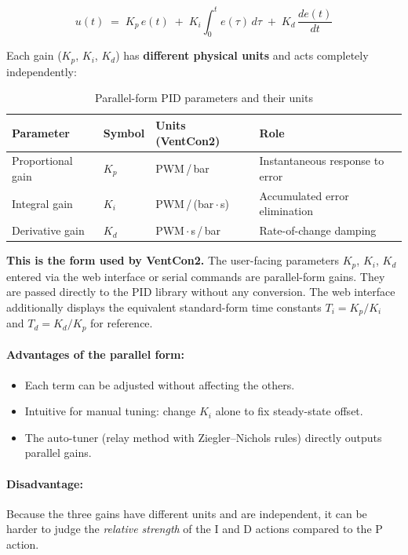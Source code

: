 \begin{equation}
    \boxed{u(t) \;=\; K_p \, e(t) \;+\; K_i \!\int_0^t e(\tau)\,d\tau \;+\; K_d \,\frac{de(t)}{dt}}
    \label{eq:pid-parallel}
\end{equation}

Each gain ($K_p$, $K_i$, $K_d$) has \textbf{different physical units} and acts completely independently:

\begin{table}[H]
\centering
\caption{Parallel-form PID parameters and their units}
\label{tab:pid-parallel-params}
\begin{tabular}{llll}
\toprule
\textbf{Parameter} & \textbf{Symbol} & \textbf{Units (VentCon2)} & \textbf{Role} \\
\midrule
Proportional gain & $K_p$ & PWM\,/\,bar & Instantaneous response to error \\
Integral gain     & $K_i$ & PWM\,/\,(bar\,$\cdot$\,s) & Accumulated error elimination \\
Derivative gain   & $K_d$ & PWM\,$\cdot$\,s\,/\,bar & Rate-of-change damping \\
\bottomrule
\end{tabular}
\end{table}

\noindent
\textbf{This is the form used by VentCon2.} The user-facing parameters $K_p$, $K_i$, $K_d$ entered via the web interface or serial commands are parallel-form gains. They are passed directly to the PID library without any conversion. The web interface additionally displays the equivalent standard-form time constants $T_i = K_p/K_i$ and $T_d = K_d/K_p$ for reference.

\paragraph{Advantages of the parallel form:}
\begin{itemize}
    \item Each term can be adjusted without affecting the others.
    \item Intuitive for manual tuning: change $K_i$ alone to fix steady-state offset.
    \item The auto-tuner (relay method with Ziegler--Nichols rules) directly outputs parallel gains.
\end{itemize}

\paragraph{Disadvantage:}
Because the three gains have different units and are independent, it can be harder to judge
the \emph{relative strength} of the I and D actions compared to the P action.

